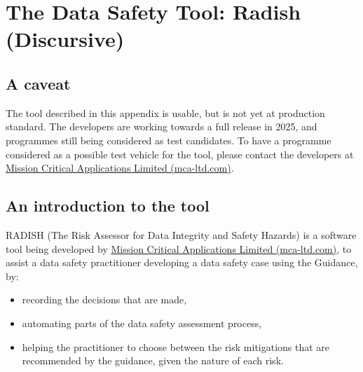 %
%
\section{The Data Safety Tool: Radish (Discursive)} \label{bkm:radish}

\cbstart


\subsection{A caveat}
The tool described in this appendix is usable, but is not yet at production standard.
The developers are working towards a full release in 2025,
and programmes still being considered as test candidates.
To have a programme considered as a possible test vehicle for the tool,
please contact the developers at
\href{https://mca-ltd.com/}{Mission Critical Applications Limited (mca-ltd.com)}.

\subsection{An introduction to the tool}
RADISH (The Risk Assessor for Data Integrity and Safety Hazards) is a software tool being developed by \href{https://mca-ltd.com/}{Mission Critical Applications Limited (mca-ltd.com)}, to assist a data safety practitioner developing a data safety case using the Guidance, by:
\begin{itemize}
  \item recording the decisions that are made,
  \item automating parts of the data safety assessment process,
  \item helping the practitioner to choose between the risk mitigations that are recommended by the guidance, given the nature of each risk.
\end{itemize}

